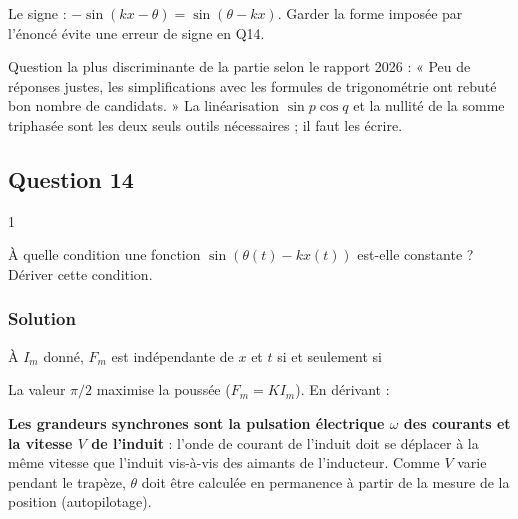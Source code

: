 \documentclass[11pt,a4paper]{article}
\newcommand{\equationajustee}[1]{%
  \sbox{\boiteequation}{$\displaystyle #1$}%
  \ifdim\wd\boiteequation>\linewidth
    \[\resizebox{\linewidth}{!}{\usebox{\boiteequation}}\]%
  \else
    \[#1\]%
  \fi}
\begin{document}
\begin{piege}

Le signe : \(-\sin(kx-\theta)=\sin(\theta-kx)\). Garder la forme imposée par l'énoncé évite une erreur de signe en Q14.

\end{piege}

\begin{jury}

Question la plus discriminante de la partie selon le rapport 2026 : « Peu de réponses justes, les simplifications avec les formules de trigonométrie ont rebuté bon nombre de candidats. » La linéarisation \(\sin p\cos q\) et la nullité de la somme triphasée sont les deux seuls outils nécessaires ; il faut les écrire.

\end{jury}

\hypertarget{question-14}{%
\subsection{Question 14}\label{question-14}}

\begin{indication}{1}

À quelle condition une fonction \(\sin(\theta(t)-kx(t))\) est-elle constante ? Dériver cette condition.

\end{indication}

\hypertarget{solution-13}{%
\subsubsection{Solution}\label{solution-13}}

À \(I_m\) donné, \(F_m\) est indépendante de \(x\) et \(t\) si et seulement si

\equationajustee{
\boxed{\theta(t)-k\,x(t)=\text{constante}}
}

La valeur \(\pi/2\) maximise la poussée (\(F_m=KI_m\)). En dérivant :

\equationajustee{
\begin{aligned}
\omega&=k\,\dot x\\
\frac{\omega}{k}&=V
\end{aligned}
}

\textbf{Les grandeurs synchrones sont la pulsation électrique \(\omega\) des courants et la vitesse \(V\) de l'induit} : l'onde de courant de l'induit doit se déplacer à la même vitesse que l'induit vis-à-vis des aimants de l'inducteur. Comme \(V\) varie pendant le trapèze, \(\theta\) doit être calculée en permanence à partir de la mesure de la position (autopilotage).
\end{document}
